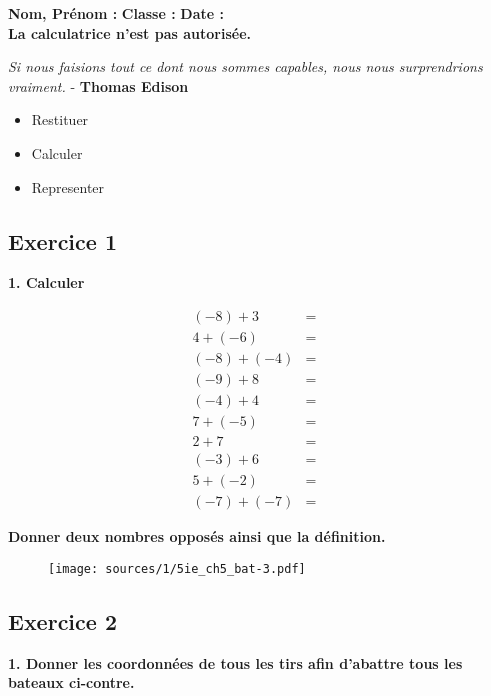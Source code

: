 \documentclass[10pt]{article}
\newcommand{\Pointille}[1][3]{\multido{}{#1}{ \makebox[\linewidth]{\dotfill}\\[\parskip]}}
\begin{document}

\textbf{Nom, Prénom :} \hspace{8cm} \textbf{Classe :} \hspace{3cm} \textbf{Date :}\\
\textbf{La calculatrice n'est pas autorisée.}

\begin{center}
  \textit{Si nous faisions tout ce dont nous sommes capables, nous nous surprendrions vraiment.}  - \textbf{Thomas Edison}
\end{center}


\begin{itemize}
\item Restituer
\item Calculer
\item Representer
\end{itemize}

\subsection*{Exercice 1} 

\textbf{1. Calculer}
\begin{multicols}{2}

  \begin{eqnarray*}
    (-8) + 3     &=& \\ 
    4 + (-6 )    &=& \\ 
    (-8) + (-4 ) &=& \\ 
    (-9) + 8     &=& \\ 
    (-4) + 4     &=& \\ 
    7 + (-5 )    &=& \\ 
    2 + 7        &=& \\ 
    (-3) + 6     &=& \\ 
    5 + (-2 )    &=& \\ 
   (-7) + (-7 )  &=& 
  \end{eqnarray*}
\end{multicols}
\textbf{Donner deux nombres opposés ainsi que la définition.}\\
\Pointille[3]


\begin{multicols}{2}
  \begin{figure}[H]
    \centering
    \texttt{[image: sources/1/5ie\_ch5\_bat-3.pdf]}
  \end{figure}
  \subsection*{Exercice 2}

  \textbf{1. Donner les coordonnées de tous les tirs afin d'abattre tous les bateaux ci-contre.}


\end{multicols}
\end{document}
